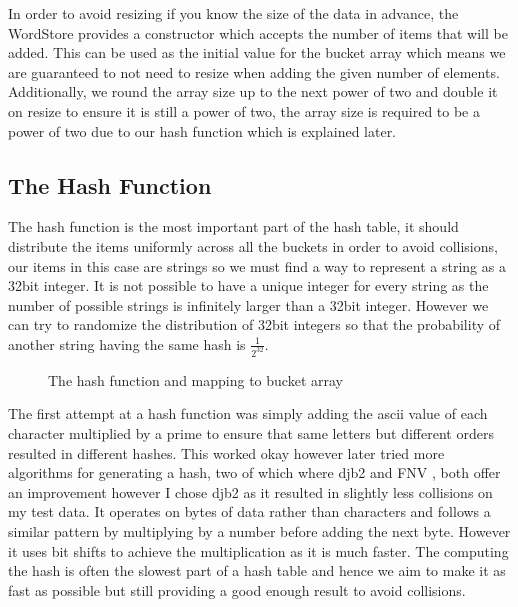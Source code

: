 \documentclass[12pt]{article}
\begin{document}
In order to avoid resizing if you know the size of the data in advance, the WordStore provides a constructor which accepts the number of items that will be added. This can be used as the initial value for the bucket array which means we are guaranteed to not need to resize when adding the given number of elements. Additionally, we round the array size up to the next power of two and double it on resize to ensure it is still a power of two, the array size is required to be a power of two due to our hash function which is explained later.

\subsection{The Hash Function}
The hash function is the most important part of the hash table, it should distribute the items uniformly across all the buckets in order to avoid collisions, our items in this case are strings so we must find a way to represent a string as a 32bit integer. It is not possible to have a unique integer for every string as the number of possible strings is infinitely larger than a 32bit integer. However we can try to randomize the distribution of 32bit integers so that the probability of another string having the same hash is $\frac{1}{2^{32}}$.

\begin{figure}[!htp]
\centering
{}
\caption{The hash function and mapping to bucket array}
\label{lst:hash_function}
\end{figure}

The first attempt at a hash function was simply adding the ascii value of each character multiplied by a prime to ensure that same letters but different orders resulted in different hashes. This worked okay however later tried more algorithms for generating a hash, two of which where djb2 \cite{hashfunctionsdjb2} and FNV \cite{hashfunctionsfnv}, both offer an improvement however I chose djb2 as it resulted in slightly less collisions on my test data. It operates on bytes of data rather than characters and follows a similar pattern by multiplying by a number before adding the next byte. However it uses bit shifts to achieve the multiplication as it is much faster. The computing the hash is often the slowest part of a hash table and hence we aim to make it as fast as possible but still providing a good enough result to avoid collisions.
\end{document}
